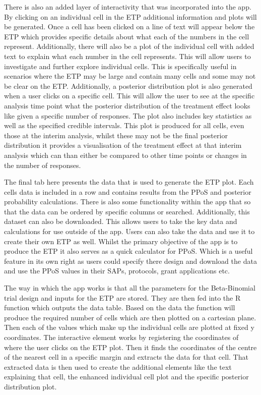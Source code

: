 There is also an added layer of interactivity that was incorporated into the app. By clicking on an individual cell in the ETP additional information and plots will be generated. Once a cell has been clicked on a line of text will appear below the ETP which provides specific details about what each of the numbers in the cell represent. Additionally, there will also be a plot of the individual cell with added text to explain what each number in the cell represents. This will allow users to investigate and further explore individual cells. This is specifically useful in scenarios where the ETP may be large and contain many cells and some may not be clear on the ETP. Additionally, a posterior distribution plot is also generated when a user clicks on a specific cell. This will allow the user to see at the specific analysis time point what the posterior distribution of the treatment effect looks like given a specific number of responses. The plot also includes key statistics as well as the specified credible intervals. This plot is produced for all cells, even those at the interim analysis, whilst these may not be the final posterior distribution it provides a visualisation of the treatment effect at that interim analysis which can than either be compared to other time points or changes in the number of responses. 

The final tab here presents the data that is used to generate the ETP plot. Each cells data is included in a row and contains results from the PPoS and posterior probability calculations. There is also some functionality within the app that so that the data can be ordered by specific columns or searched. Additionally, this dataset can also be downloaded. This allows users to take the key data and calculations for use outside of the app. Users can also take the data and use it to create their own ETP as well. Whilst the primary objective of the app is to produce the ETP it also serves as a quick calculator for PPoS. Which is a useful feature in its own right as users could specify there design and download the data and use the PPoS values in their SAPs, protocols, grant applications etc.   

The way in which the app works is that all the parameters for the Beta-Binomial trial design and inputs for the ETP are stored. They are then fed into the R function which outputs the data table. Based on the data the function will produce the required number of cells which are then plotted on a cartesian plane. Then each of the values which make up the individual cells are plotted at fixed y coordinates. The interactive element works by registering the coordinates of where the user clicks on the ETP plot. Then it finds the coordinates of the centre of the nearest cell in a specific margin and extracts the data for that cell. That extracted data is then used to create the additional elements like the text explaining that cell, the enhanced individual cell plot and the specific posterior distribution plot. 


